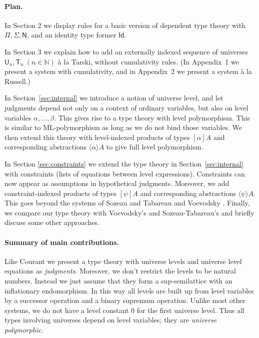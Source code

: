 \documentclass[11pt,a4paper]{article}
\theoremstyle{definition}
\newcommand{\Id}{\mathsf{Id}}
\newcommand{\NN}{\mathsf{N}}
\newcommand{\Nat}{\mathbb{N}}
\newcommand{\UU}{\mathsf{U}}
\newcommand{\lam}[1]{{\langle}#1{\rangle}}
\newcommand{\T}{\mathsf{T}}
\begin{document}
\paragraph{Plan.}
In Section 2 we display rules for a basic version of dependent type theory with
$\Pi, \Sigma, \NN$, and an identity type former $\Id$.

In Section 3 we explain how to add an externally indexed sequence of universes
$\UU_n, \T_n~(n\in\Nat)$ \`a la Tarski, without cumulativity rules.
(In Appendix~1 we present a system with cumulativity,
and in Appendix~2 we present a system \`a la Russell.)

In Section~\ref{sec:internal} we introduce a notion of universe level,
and let judgments depend not only on a context of ordinary variables,
but also on level variables $\alpha, \ldots, \beta$.
This gives rise to a type theory with level polymorphism.
This is similar to ML-polymorphism as long as we do not bind those variables.
We then extend this theory with level-indexed products of
types $[\alpha]A$ and corresponding abstractions $\lam{\alpha}A$
to give full level polymorphism.

In Section \ref{sec:constraints} we extend the type theory in
Section~\ref{sec:internal} with constraints (lists of equations between level expressions). Constraints can now appear as assumptions in hypothetical judgments. Moreover, we add
constraint-indexed products of types $[\psi]A$ and corresponding
abstractions $\lam{\psi}A$. This goes beyond the systems of Sozeau and Tabareau \cite{SozeauTabareau:coq} and Voevodsky \cite{VV}.
Finally, we %
compare our type theory with Voevodsky's and Sozeau-Tabareau's
and briefly discuss some other approaches.

\paragraph{Summary of main contributions.}
Like Courant we present a type theory with
universe levels  and universe level equations as \emph{judgments}. Moreover, we don't restrict the levels to be natural numbers. Instead we just assume that they form a sup-semilattice with an inflationary endomorphism. In this way all levels are built up from level variables by a successor operation and a binary supremum operation. Unlike most other systems, we do not have a level constant $0$ for the first universe level. Thus all types involving universes depend on level variables; they are {\em universe polymorphic}.
\end{document}

